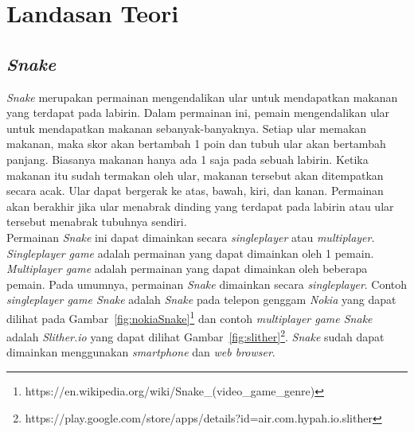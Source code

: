 \chapter{Landasan Teori}
\label{chap:teori}



\section{\textit{Snake}}
\label{sec:snake}
\textit{Snake} merupakan permainan mengendalikan ular untuk mendapatkan makanan yang terdapat pada labirin. Dalam permainan ini, pemain mengendalikan ular untuk mendapatkan makanan sebanyak-banyaknya. Setiap ular memakan makanan, maka skor akan bertambah 1 poin dan tubuh ular akan bertambah panjang. Biasanya makanan hanya ada 1 saja pada sebuah labirin. Ketika makanan itu sudah termakan oleh ular, makanan tersebut akan ditempatkan secara acak. Ular dapat bergerak ke atas, bawah, kiri, dan kanan. Permainan akan berakhir jika ular menabrak dinding yang terdapat pada labirin atau ular tersebut menabrak tubuhnya sendiri. \\

Permainan \textit{Snake} ini dapat dimainkan secara \textit{singleplayer} atau \textit{multiplayer}. \textit{Singleplayer game} adalah permainan yang dapat dimainkan oleh 1 pemain. \textit{Multiplayer game} adalah permainan yang dapat dimainkan oleh beberapa pemain. Pada umumnya, permainan \textit{Snake} dimainkan secara \textit{singleplayer}. Contoh \textit{singleplayer game Snake} adalah \textit{Snake} pada telepon genggam \textit{Nokia} yang dapat dilihat pada Gambar~\ref{fig:nokiaSnake}\footnote{https://en.wikipedia.org/wiki/Snake\_(video\_game\_genre)} dan contoh \textit{multiplayer game Snake} adalah \textit{Slither.io} yang dapat dilihat Gambar~\ref{fig:slither}\footnote{https://play.google.com/store/apps/details?id=air.com.hypah.io.slither}. \textit{Snake} sudah dapat dimainkan menggunakan \textit{smartphone} dan \textit{web browser}.  


